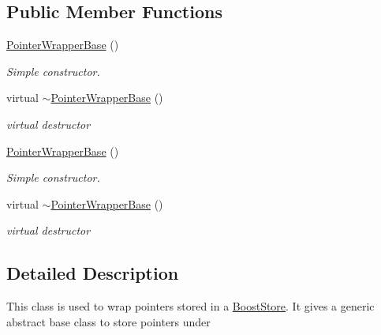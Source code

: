 \subsection*{Public Member Functions}
\begin{DoxyCompactItemize}
\item 
\hypertarget{classPointerWrapperBase_ac9e248557a8aa248bcbbadc469c77f52}{\hyperlink{classPointerWrapperBase_ac9e248557a8aa248bcbbadc469c77f52}{Pointer\-Wrapper\-Base} ()}\label{classPointerWrapperBase_ac9e248557a8aa248bcbbadc469c77f52}

\begin{DoxyCompactList}\small\item\em Simple constructor. \end{DoxyCompactList}\item 
\hypertarget{classPointerWrapperBase_a842fb0af38187d71678971452c1e1094}{virtual \hyperlink{classPointerWrapperBase_a842fb0af38187d71678971452c1e1094}{$\sim$\-Pointer\-Wrapper\-Base} ()}\label{classPointerWrapperBase_a842fb0af38187d71678971452c1e1094}

\begin{DoxyCompactList}\small\item\em virtual destructor \end{DoxyCompactList}\item 
\hypertarget{classPointerWrapperBase_ac9e248557a8aa248bcbbadc469c77f52}{\hyperlink{classPointerWrapperBase_ac9e248557a8aa248bcbbadc469c77f52}{Pointer\-Wrapper\-Base} ()}\label{classPointerWrapperBase_ac9e248557a8aa248bcbbadc469c77f52}

\begin{DoxyCompactList}\small\item\em Simple constructor. \end{DoxyCompactList}\item 
\hypertarget{classPointerWrapperBase_a842fb0af38187d71678971452c1e1094}{virtual \hyperlink{classPointerWrapperBase_a842fb0af38187d71678971452c1e1094}{$\sim$\-Pointer\-Wrapper\-Base} ()}\label{classPointerWrapperBase_a842fb0af38187d71678971452c1e1094}

\begin{DoxyCompactList}\small\item\em virtual destructor \end{DoxyCompactList}\end{DoxyCompactItemize}


\subsection{Detailed Description}
This class is used to wrap pointers stored in a \hyperlink{classBoostStore}{Boost\-Store}. It gives a generic abstract base class to store pointers under

